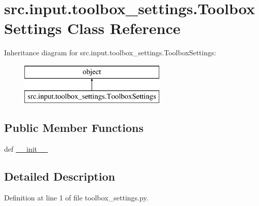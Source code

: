\hypertarget{classsrc_1_1input_1_1toolbox__settings_1_1_toolbox_settings}{\section{src.\+input.\+toolbox\+\_\+settings.\+Toolbox\+Settings Class Reference}
\label{classsrc_1_1input_1_1toolbox__settings_1_1_toolbox_settings}
}
Inheritance diagram for src.\+input.\+toolbox\+\_\+settings.\+Toolbox\+Settings\+:\begin{figure}[H]
\begin{center}
\leavevmode
\includegraphics[height=2.000000cm]{classsrc_1_1input_1_1toolbox__settings_1_1_toolbox_settings}
\end{center}
\end{figure}
\subsection*{Public Member Functions}
\begin{DoxyCompactItemize}
\item 
def \hyperlink{classsrc_1_1input_1_1toolbox__settings_1_1_toolbox_settings_a1757a2faee64c1f2a219725de9b7e245}{\+\_\+\+\_\+init\+\_\+\+\_\+}
\end{DoxyCompactItemize}


\subsection{Detailed Description}


Definition at line 1 of file toolbox\+\_\+settings.\+py.



